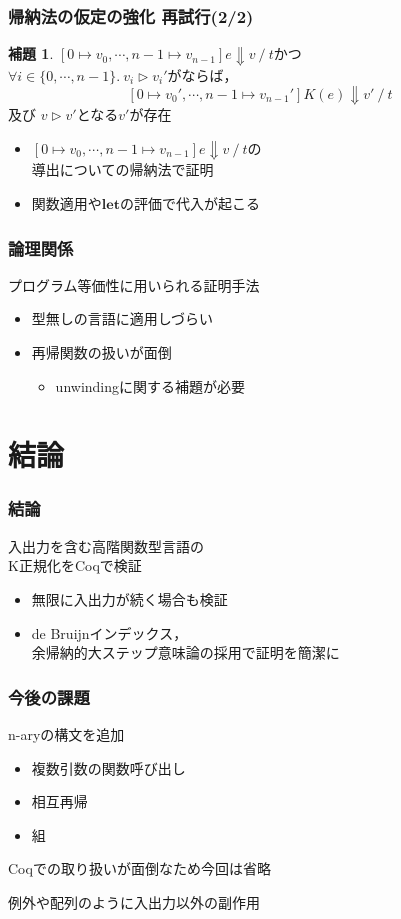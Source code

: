 \documentclass[dvipdfmx,cjk,xcolor=dvipsnames,envcountsect,notheorems,12pt]{beamer}
\theoremstyle{definition}
\newtheorem{lemma}{補題}
\newcommand{\keyword}[1]{\mathbf{#1}}
\newcommand{\LET}{\keyword{let}}
\begin{document}
\begin{frame}
	\frametitle{帰納法の仮定の強化 再試行(2/2)}
	\large
	\begin{lemma}
		$[0\mapsto v_0,\cdots , n-1\mapsto v_{n-1}]e\Downarrow v~/~t$かつ\\
		$\forall i\in \{0,\cdots,n-1\}.~v_i \rhd v_i'$がならば，
		\[[0\mapsto v_0',\cdots , n-1\mapsto v_{n-1}']K(e)\Downarrow v'~/~t\]及び
		$v\rhd v'$となる$v'$が存在
	\end{lemma}

	\begin{itemize}
		\item $[0\mapsto v_0,\cdots , n-1\mapsto v_{n-1}]e\Downarrow v~/~t$の\\
			導出についての帰納法で証明
		\item 関数適用や$\LET$の評価で代入が起こる
	\end{itemize}
\end{frame}

\begin{frame}
	\frametitle{論理関係}
	\Large プログラム等価性に用いられる証明手法
	\begin{itemize}
		\item 型無しの言語に適用しづらい
		\item 再帰関数の扱いが面倒
			\begin{itemize}
				\item unwindingに関する補題が必要
			\end{itemize}
	\end{itemize}
\end{frame}

\section{結論}

\begin{frame}
	\frametitle{結論}
	\LARGE 入出力を含む高階関数型言語の\\
	K正規化をCoqで検証
	\begin{itemize}
		\item 無限に入出力が続く場合も検証
		\item de Bruijnインデックス，\\
			余帰納的大ステップ意味論の採用で証明を簡潔に
	\end{itemize}
\end{frame}

\begin{frame}
	\frametitle{今後の課題}
	\LARGE n-aryの構文を追加
	\begin{itemize}
		\item 複数引数の関数呼び出し
		\item 相互再帰
		\item 組
	\end{itemize}
	{\large Coqでの取り扱いが面倒なため今回は省略}

	\vfill

	{\Large 例外や配列のように入出力以外の副作用}
\end{frame}
\end{document}

